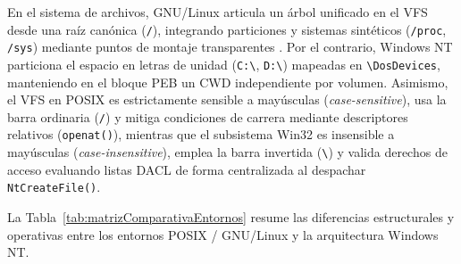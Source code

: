 \documentclass[12pt]{article}
\begin{document}
En el sistema de archivos, GNU/Linux articula un árbol unificado en el VFS desde una raíz canónica (\texttt{/}), integrando particiones y sistemas sintéticos (\texttt{/proc}, \texttt{/sys}) mediante puntos de montaje transparentes \parencite[\S 13.2, p.\ 455]{silberschatz2006fundamentos}. Por el contrario, Windows NT particiona el espacio en letras de unidad (\texttt{C:\textbackslash}, \texttt{D:\textbackslash}) mapeadas en \texttt{\textbackslash DosDevices}, manteniendo en el bloque PEB un CWD independiente por volumen. Asimismo, el VFS en POSIX es estrictamente sensible a mayúsculas (\textit{case-sensitive}), usa la barra ordinaria (\texttt{/}) y mitiga condiciones de carrera mediante descriptores relativos (\texttt{openat()}), mientras que el subsistema Win32 es insensible a mayúsculas (\textit{case-insensitive}), emplea la barra invertida (\texttt{\textbackslash}) y valida derechos de acceso evaluando listas DACL de forma centralizada al despachar \texttt{NtCreateFile()}.

La Tabla~\ref{tab:matrizComparativaEntornos} resume las diferencias estructurales y operativas entre los entornos POSIX / GNU/Linux y la arquitectura Windows NT.
\end{document}
